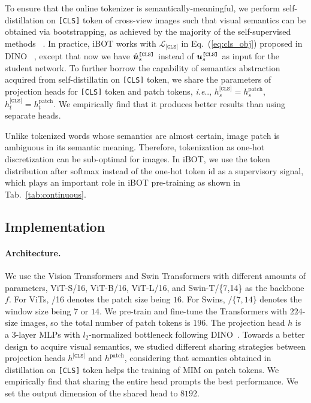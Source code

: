 \documentclass{article} %
\makeatletter
\def\ourmethod{{iBOT}\xspace}
\DeclareRobustCommand\onedot{\futurelet\@let@token\@onedot}
\def\@onedot{\ifx\@let@token.\else.\null\fi\xspace}
\def\ie{\emph{i.e}\onedot} \def\Ie{\emph{I.e}\onedot}
\makeatother
\begin{document}
To ensure that the online tokenizer is semantically-meaningful, we perform self-distillation on \texttt{[CLS]} token of cross-view images such that visual semantics can be obtained via bootstrapping, as achieved by the majority of the self-supervised methods ~\citep{moco,byol,dino}. 
In practice, \ourmethod works with $\mathcal{L}_{\texttt{[CLS]}}$ in Eq.~(\ref{eq:cls_obj}) proposed in DINO ~\citep{dino}, except that now we have $\hat {{\bm{u}}}_s^{\texttt{[CLS]}}$ instead of ${\bm{u}}_s^{\texttt{[CLS]}}$ as input for the student network. To further borrow the capability of semantics abstraction acquired from self-distillatin on \texttt{[CLS]} token, we share the parameters of projection heads for \texttt{[CLS]} token and patch tokens, \ie, $h_s^\texttt{[CLS]} = h_s^\mathrm{patch}$, $h_t^\texttt{[CLS]} = h_t^\mathrm{patch}$. We empirically find that it produces better results than using separate heads.

Unlike tokenized words whose semantics are almost certain, image patch is ambiguous in its semantic meaning. Therefore, tokenization as one-hot discretization can be sub-optimal for images. 
In \ourmethod, we use the token distribution after softmax instead of the one-hot token id as a supervisory signal, which plays an important role in \ourmethod pre-training as shown in Tab.~\ref{tab:continuous}. 

\subsection{Implementation}
\label{sec:implementation}

\paragraph{Architecture.} 
We use the Vision Transformers \citep{vit} and Swin Transformers \citep{swin} with different amounts of parameters, ViT-S/16, ViT-B/16, ViT-L/16, and Swin-T/\{7,14\} as the backbone $f$. For ViTs, /16 denotes the patch size being $16$. For Swins, $/\{7,14\}$ denotes the window size being $7$ or $14$.
We pre-train and fine-tune the Transformers with $224$-size images, so the total number of patch tokens is $196$. The projection head $h$ is a $3$-layer 
MLPs
with $l_2$-normalized bottleneck following DINO~\citep{dino}. 
Towards a better design to acquire visual semantics, we studied different sharing strategies between projection heads $h^\texttt{[CLS]}$ and $h^\mathrm{patch}$, considering that semantics obtained in distillation on \texttt{[CLS]} token helps the training of MIM on patch tokens. We empirically find that sharing the entire head prompts the best performance. 
We set the output dimension of the shared head to $8192$.
\end{document}
